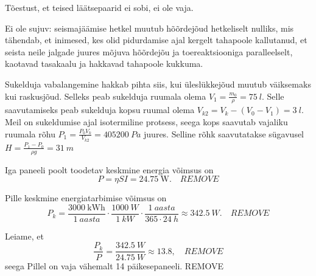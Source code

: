 \documentclass[10pt]{article}
\newcommand{\p}[1]{REMOVE}
\begin{document}
Tõestust, et teised läätsepaarid ei sobi, ei ole vaja.
\probend
\bigskip


\solu
\par
Ei ole sujuv: seismajäämise hetkel muutub hõõrdejõud hetkeliselt nulliks, mis tähendab, et inimesed, kes olid pidurdamise ajal kergelt tahapoole kallutanud, et seista neile jalgade juures mõjuva hõõrdejõu ja toereaktsiooniga paralleelselt, kaotavad tasakaalu ja hakkavad tahapoole kukkuma.
\probend
\bigskip


\solu
Sukelduja vabalangemine hakkab pihta siis, kui üleslükkejõud muutub väiksemaks kui raskusjõud. Selleks peab sukelduja ruumala olema $V_1 = \frac{m_0}{\rho} = \SI{75}{l}$. Selle saavutamiseks peab sukelduja kopsu ruumal olema $V_{k2} = V_{k} - (V_0 - V_1) = \SI{3}{l}$. Meil on sukeldumise ajal isotermiline protsess, seega kops saavutab vajaliku ruumala rõhu $P_1 = \frac{P_0V_{k}}{V_{k2}} = \SI{405200}{Pa}$ juures. Selline rõhk saavutatakse sügavusel $H = \frac{P_1 - P_0}{\rho g} = \SI{31}{m}$
\probend
\bigskip


\solu
Iga paneeli poolt toodetav keskmine energia võimsus on
\begin{equation*}
    P = \eta S I = \SI{24.75}{\W}. \quad\p{2}
\end{equation*}

Pille keskmine energiatarbimise võimsus on
\begin{equation*}
    P_k = \frac{\SI{3000}{\kWh}}{\SI{1}{aasta}} \cdot \frac{\SI{1000}{W}}{\SI{1}{kW}}\cdot\frac{\SI{1}{aasta}}{\num{365}\cdot\SI{24}{h}} \approx \SI{342.5}{W}. \quad\p{2}
\end{equation*}

Leiame, et
\begin{equation*}
    \frac{P_k}{P} = \frac{\SI{342.5}{W}}{\SI{24.75}{W}} \approx \num{13.8}, \quad\p{1}
\end{equation*}
seega Pillel on vaja vähemalt 14 päikesepaneeli. \p{1}
\probend
\bigskip

\end{document}
